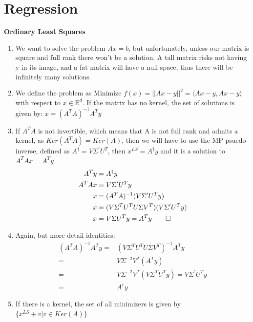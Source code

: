 \documentclass[12pt,twoside]{article}
\newcommand{\R}{\mathbb{R}}
\begin{document}
\section*{Regression}
\textbf{Ordinary Least Squares}
\begin{enumerate}
    \item We want to solve the problem $Ax=b$, but unfortunately, unless our matrix is square and full rank there won't be a solution. A tall matrix risks not having y in its image, and a fat matrix will have a null space, thus there will be infinitely many solutions.
    \item We define the problem as Minimize $f(x) = ||Ax-y||^2 = \langle Ax-y, Ax-y \rangle$ with respect to $x\in \R^d$. If the matrix has no kernel, the set of solutions is given by: $x = (A^TA)^{-1}A^Ty$
    \item If $A^TA$ is not invertible, which means that A is not full rank and admits a kernel, as $Ker(A^TA) = Ker(A)$, then we will have to use the MP psuedo-inverse, defined as $A^\dagger = V\Sigma^\prime U^T$, then $x^{LS} = A^\dagger y$ and it is a solution to $A^TAx = A^Ty$
    \begin{equation}
        \begin{split}
            A^Ty &= A^\dagger y \\
            A^TAx &= V\Sigma^\prime U^T y \\
            x &= (A^TA)^{-1} (V\Sigma^\prime U^T y)\\
            x &= (V\Sigma^TU^TU\Sigma V^T)(V\Sigma^\prime U^T y) \\ 
            x &= V\Sigma U^Ty = A^T y \qed
        \end{split}
    \end{equation}
    \item Again, but more detail identities:
    \begin{equation}
        \begin{split}
            (A^TA)^{-1}A^Ty =& (V\Sigma^T U^T U \Sigma V^T)^{-1}A^Ty \\
            =& V\Sigma^{-2}V^T(A^Ty) \\
            =& V\Sigma^{-2}V^T(V\Sigma^TU^Ty) = V\Sigma^\prime U^Ty \\
            =& A^\dagger y
        \end{split}
    \end{equation}
    \item If there is a kernel, the set of all minimizers is given by $\{ x^{LS} + v | v \in Ker(A) \}$
\end{enumerate}
\end{document}
